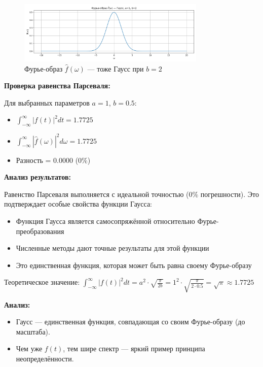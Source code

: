 \begin{figure}[H]
    \centering
    \includegraphics[width=0.8\textwidth]{gauss_spectrum_b2.png}
    \caption{Фурье-образ $\hat{f}(\omega)$ — тоже Гаусс при $b = 2$}
\end{figure}

\textbf{Проверка равенства Парсеваля:}

Для выбранных параметров $a = 1$, $b = 0.5$:
\begin{itemize}
    \item $\displaystyle \int_{-\infty}^{\infty} |f(t)|^2 dt = 1.7725$
    \item $\displaystyle \int_{-\infty}^{\infty} |\hat{f}(\omega)|^2 d\omega = 1.7725$
    \item Разность = $0.0000$ (0\%)
\end{itemize}

\textbf{Анализ результатов:}

Равенство Парсеваля выполняется с идеальной точностью (0\% погрешности). Это подтверждает особые свойства функции Гаусса:
\begin{itemize}
    \item Функция Гаусса является самосопряжённой относительно Фурье-преобразования
    \item Численные методы дают точные результаты для этой функции
    \item Это единственная функция, которая может быть равна своему Фурье-образу
\end{itemize}

Теоретическое значение: $\displaystyle \int_{-\infty}^{\infty} |f(t)|^2 dt = a^2 \cdot \sqrt{\frac{\pi}{2b}} = 1^2 \cdot \sqrt{\frac{\pi}{2 \cdot 0.5}} = \sqrt{\pi} \approx 1.7725$

\textbf{Анализ:}

\begin{itemize}
    \item Гаусс — единственная функция, совпадающая со своим Фурье-образу (до масштаба).
    \item Чем уже $f(t)$, тем шире спектр — яркий пример принципа неопределённости.
\end{itemize}

